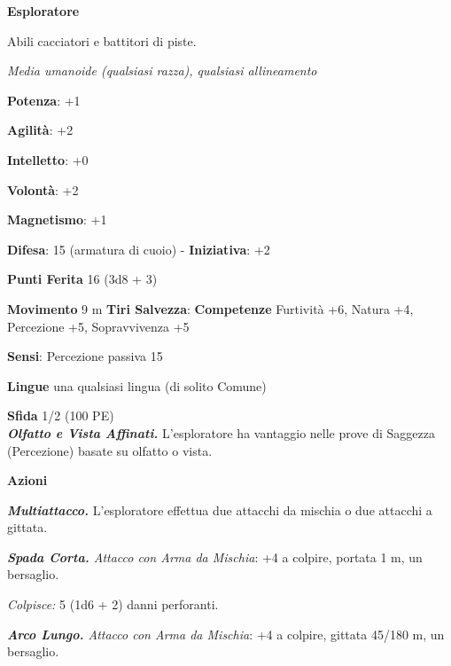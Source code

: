 \begin{multicols}{2}
\textbf{Esploratore}

Abili cacciatori e battitori di piste.

\emph{Media umanoide (qualsiasi razza), qualsiasi allineamento}

\textbf{Potenza}: +1

\textbf{Agilità}: +2

\textbf{Intelletto}: +0

\textbf{Volontà}: +2

\textbf{Magnetismo}: +1

\textbf{Difesa}: 15 (armatura di cuoio) - \textbf{Iniziativa}: +2

\textbf{Punti Ferita} 16 (3d8 + 3)

\textbf{Movimento} 9 m
\textbf{Tiri Salvezza}:
\textbf{Competenze} Furtività +6, Natura +4, Percezione +5, Sopravvivenza +5

\textbf{Sensi}: Percezione passiva 15

\textbf{Lingue} una qualsiasi lingua (di solito Comune)

\textbf{Sfida} 1/2 (100 PE)\smallskip\\

\emph{\textbf{Olfatto e Vista Affinati.}} L'esploratore ha vantaggio
nelle prove di Saggezza (Percezione) basate su olfatto o vista.

\smallskip\textbf{Azioni}

\emph{\textbf{Multiattacco.}} L'esploratore effettua due attacchi da
mischia o due attacchi a gittata.

\emph{\textbf{Spada Corta.} Attacco con Arma da Mischia}: +4 a colpire,
portata 1 m, un bersaglio.

\emph{Colpisce:} 5 (1d6 + 2) danni perforanti.

\emph{\textbf{Arco Lungo.} Attacco con Arma da Mischia}: +4 a colpire,
gittata 45/180 m, un bersaglio.

\end{multicols}
